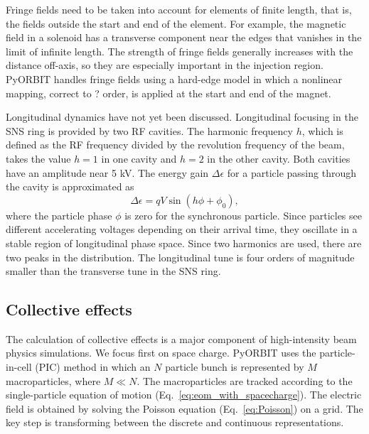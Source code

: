 Fringe fields need to be taken into account for elements of finite length, that is, the fields outside the start and end of the element. For example, the magnetic field in a solenoid has a transverse component near the edges that vanishes in the limit of infinite length. The strength of fringe fields generally increases with the distance off-axis, so they are especially important in the injection region. PyORBIT handles fringe fields using a hard-edge model in which a nonlinear mapping, correct to ? order, is applied at the start and end of the magnet.

Longitudinal dynamics have not yet been discussed. Longitudinal focusing in the SNS ring is provided by two RF cavities. The harmonic frequency $h$, which is defined as the RF frequency divided by the revolution frequency of the beam, takes the value $h = 1$ in one cavity and $h = 2$ in the other cavity. Both cavities have an amplitude near 5 kV. The energy gain $\Delta \epsilon$ for a particle passing through the cavity is approximated as  
%
\begin{equation}\label{eq:RF}
    \Delta \epsilon = q V \sin(h \phi + \phi_0),
\end{equation}
%
where the particle phase $\phi$ is zero for the synchronous particle. Since particles see different accelerating voltages depending on their arrival time, they oscillate in a stable region of longitudinal phase space. Since two harmonics are used, there are two peaks in the distribution. The longitudinal tune is four orders of magnitude smaller than the transverse tune in the SNS ring. 



\subsection{Collective effects}

The calculation of collective effects is a major component of high-intensity beam physics simulations. We focus first on space charge. PyORBIT uses the particle-in-cell (PIC) method in which an $N$ particle bunch is represented by $M$ macroparticles, where $M \ll N$. The macroparticles are tracked according to the single-particle equation of motion (Eq.~\eqref{eq:eom_with_spacecharge}). The electric field is obtained by solving the Poisson equation (Eq.~\eqref{eq:Poisson}) on a grid. The key step is transforming between the discrete and continuous representations. 


